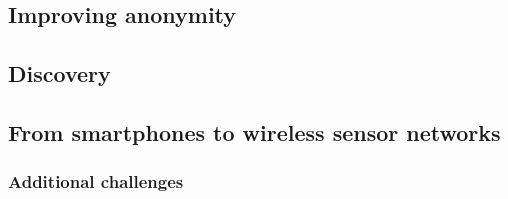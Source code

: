 \documentclass[10pt,journal,compsoc]{IEEEtran}
\begin{document}
\subsection{Improving anonymity}



\subsection{Discovery}

\subsection{From smartphones to wireless sensor networks}

\subsubsection{Additional challenges}
%
%

\end{document}
